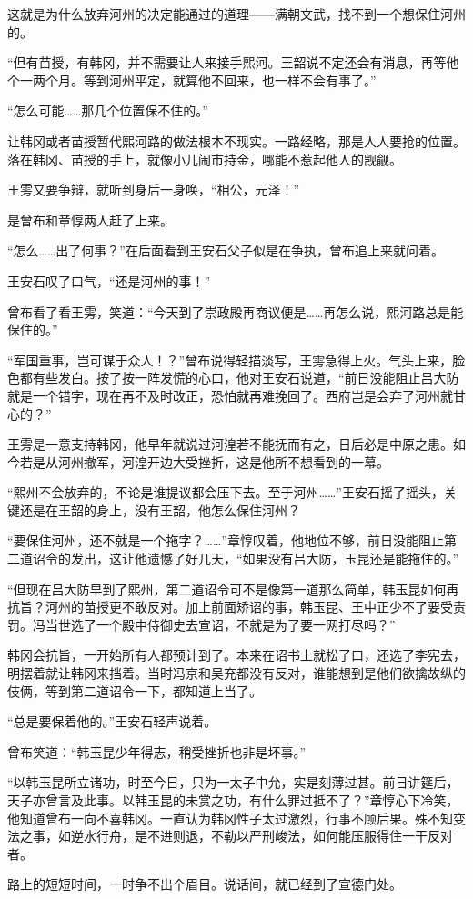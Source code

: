 这就是为什么放弃河州的决定能通过的道理——满朝文武，找不到一个想保住河州的。

“但有苗授，有韩冈，并不需要让人来接手熙河。王韶说不定还会有消息，再等他个一两个月。等到河州平定，就算他不回来，也一样不会有事了。”

“怎么可能……那几个位置保不住的。”

让韩冈或者苗授暂代熙河路的做法根本不现实。一路经略，那是人人要抢的位置。落在韩冈、苗授的手上，就像小儿闹市持金，哪能不惹起他人的觊觎。

王雱又要争辩，就听到身后一身唤，“相公，元泽！”

是曾布和章惇两人赶了上来。

“怎么……出了何事？”在后面看到王安石父子似是在争执，曾布追上来就问着。

王安石叹了口气，“还是河州的事！”

曾布看了看王雱，笑道：“今天到了崇政殿再商议便是……再怎么说，熙河路总是能保住的。”

“军国重事，岂可谋于众人！？”曾布说得轻描淡写，王雱急得上火。气头上来，脸色都有些发白。按了按一阵发慌的心口，他对王安石说道，“前日没能阻止吕大防就是一个错字，现在再不及时改正，恐怕就再难挽回了。西府岂是会弃了河州就甘心的？”

王雱是一意支持韩冈，他早年就说过河湟若不能抚而有之，日后必是中原之患。如今若是从河州撤军，河湟开边大受挫折，这是他所不想看到的一幕。

“熙州不会放弃的，不论是谁提议都会压下去。至于河州……”王安石摇了摇头，关键还是在王韶的身上，没有王韶，他怎么保住河州？

“要保住河州，还不就是一个拖字？……”章惇叹着，他地位不够，前日没能阻止第二道诏令的发出，这让他遗憾了好几天，“如果没有吕大防，玉昆还是能拖住的。”

“但现在吕大防早到了熙州，第二道诏令可不是像第一道那么简单，韩玉昆如何再抗旨？河州的苗授更不敢反对。加上前面矫诏的事，韩玉昆、王中正少不了要受责罚。冯当世选了一个殿中侍御史去宣诏，不就是为了要一网打尽吗？”

韩冈会抗旨，一开始所有人都预计到了。本来在诏书上就松了口，还选了李宪去，明摆着就让韩冈来挡着。当时冯京和吴充都没有反对，谁能想到是他们欲擒故纵的伎俩，等到第二道诏令一下，都知道上当了。

“总是要保着他的。”王安石轻声说着。

曾布笑道：“韩玉昆少年得志，稍受挫折也非是坏事。”

“以韩玉昆所立诸功，时至今日，只为一太子中允，实是刻薄过甚。前日讲筵后，天子亦曾言及此事。以韩玉昆的未赏之功，有什么罪过抵不了？”章惇心下冷笑，他知道曾布一向不喜韩冈。一直认为韩冈性子太过激烈，行事不顾后果。殊不知变法之事，如逆水行舟，是不进则退，不勒以严刑峻法，如何能压服得住一干反对者。

路上的短短时间，一时争不出个眉目。说话间，就已经到了宣德门处。

